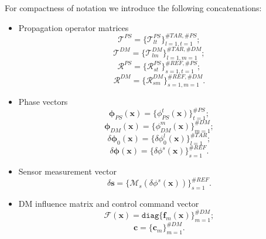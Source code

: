 For compactness of notation we introduce the following concatenations:
\begin{itemize}
	\item Propagation operator matrices
	\begin{equation} \label{eq:ps-tar-matrix}
		\mathcal{T}^{PS} = \{ \mathcal{T}^{PS}_{lt} \}_{l=1,t=1}^{\#TAR,\#PS};
	\end{equation}
	\begin{equation} \label{eq:dm-tar-matrix}
		\mathcal{T}^{DM} = \{ \mathcal{T}^{DM}_{lm} \}_{l=1,m=1}^{\#TAR,\#DM};
	\end{equation}
	\begin{equation} \label{eq:ps-ref-matrix}
		\mathcal{R}^{PS} = \{ \mathcal{R}^{PS}_{st} \}_{s=1,t=1}^{\#REF,\#PS};
	\end{equation}
	\begin{equation} \label{eq:dm-ref-matrix}
		\mathcal{R}^{DM} = \{ \mathcal{R}^{DM}_{sm} \}_{s=1,m=1}^{\#REF,\#DM}.
	\end{equation}

	\item Phase vectors
	\begin{equation} \label{eq:ps-vector}
    \bm{\phi}_{PS} (\bm{x}) = \{ \phi_{PS}^{t} (\bm{x}) \}_{t=1}^{\#PS};
	\end{equation}
	\begin{equation} \label{eq:dm-vector}
    \bm{\phi}_{DM} (\bm{x}) = \{ \phi_{DM}^{m} (\bm{x}) \}_{m=1}^{\#DM};
	\end{equation}
	\begin{equation} \label{eq:ps-dm-tar-vector}
    \delta \bm{\phi}_{0} (\bm{x}) =
    \{ \delta \phi_{0}^{l} (\bm{x}) \}_{l=1}^{\#TAR};
	\end{equation}
	\begin{equation} \label{eq:ps-dm-ref-vector}
    \delta \bm{\phi} (\bm{x}) =
    \{ \delta \phi^{s} (\bm{x}) \}_{s=1}^{\#REF}.
	\end{equation}

	\item Sensor measurement vector
	\begin{equation} \label{eq:mcao-meas}
		\delta \bm{s} =
		\{  \mathcal{M}_{s} (\delta \phi^{s}(\bm{x})) \}_{s=1}^{\#REF}.
	\end{equation}

	\item DM influence matrix and control command vector
	\begin{equation} \label{eq:mcao-inf}
		\mathcal{F} (\bm{x}) = \texttt{diag} \{ \bm{f}_{m} (\bm{x}) \}_{m=1}^{\#DM};
	\end{equation}
	\begin{equation} \label{eq:mcao-command}
		\bm{c} = \{ \bm{c}_{m} \}_{m=1}^{\#DM}.
	\end{equation}


\end{itemize}
